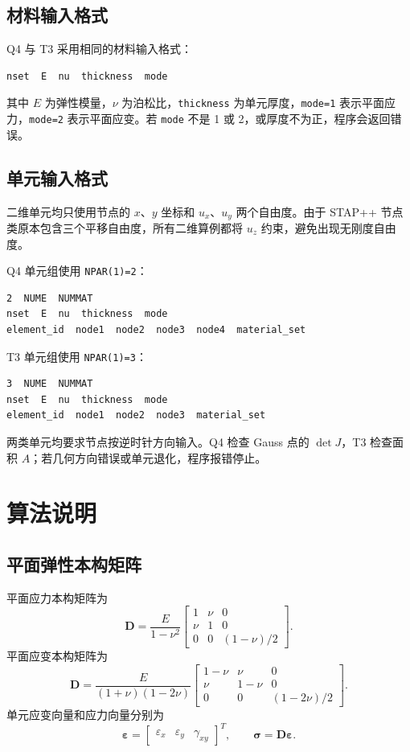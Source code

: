 ﻿\documentclass[UTF8,11pt,a4paper]{ctexart}
\begin{document}
\subsection{材料输入格式}
Q4 与 T3 采用相同的材料输入格式：
\begin{lstlisting}
nset  E  nu  thickness  mode
\end{lstlisting}
其中 $E$ 为弹性模量，$\nu$ 为泊松比，\texttt{thickness} 为单元厚度，\texttt{mode=1} 表示平面应力，\texttt{mode=2} 表示平面应变。若 \texttt{mode} 不是 1 或 2，或厚度不为正，程序会返回错误。

\subsection{单元输入格式}
二维单元均只使用节点的 $x$、$y$ 坐标和 $u_x$、$u_y$ 两个自由度。由于 STAP++ 节点类原本包含三个平移自由度，所有二维算例都将 $u_z$ 约束，避免出现无刚度自由度。

Q4 单元组使用 \texttt{NPAR(1)=2}：
\begin{lstlisting}
2  NUME  NUMMAT
nset  E  nu  thickness  mode
element_id  node1  node2  node3  node4  material_set
\end{lstlisting}
T3 单元组使用 \texttt{NPAR(1)=3}：
\begin{lstlisting}
3  NUME  NUMMAT
nset  E  nu  thickness  mode
element_id  node1  node2  node3  material_set
\end{lstlisting}
两类单元均要求节点按逆时针方向输入。Q4 检查 Gauss 点的 $\det J$，T3 检查面积 $A$；若几何方向错误或单元退化，程序报错停止。

\section{算法说明}
\subsection{平面弹性本构矩阵}
平面应力本构矩阵为
\begin{equation}
\bm D=\frac{E}{1-\nu^2}
\begin{bmatrix}
1&\nu&0\\
\nu&1&0\\
0&0&(1-\nu)/2
\end{bmatrix}.
\end{equation}
平面应变本构矩阵为
\begin{equation}
\bm D=\frac{E}{(1+\nu)(1-2\nu)}
\begin{bmatrix}
1-\nu&\nu&0\\
\nu&1-\nu&0\\
0&0&(1-2\nu)/2
\end{bmatrix}.
\end{equation}
单元应变向量和应力向量分别为
\begin{equation}
\bm\varepsilon=\begin{bmatrix}\varepsilon_x&\varepsilon_y&\gamma_{xy}\end{bmatrix}^T,
\qquad
\bm\sigma=\bm D\bm\varepsilon.
\end{equation}
\end{document}
